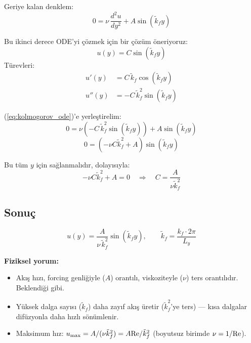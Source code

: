 Geriye kalan denklem:
\begin{equation}
    \boxed{0 = \nu \, \frac{d^2 u}{d y^2} + A \sin(\tilde{k}_f y)}
    \label{eq:kolmogorov_ode}
\end{equation}

Bu ikinci derece ODE'yi çözmek için bir çözüm öneriyoruz:
\begin{equation}
    u(y) = C \sin(\tilde{k}_f y)
\end{equation}
Türevleri:
\begin{align}
    u'(y) &= C \, \tilde{k}_f \cos(\tilde{k}_f y) \\
    u''(y) &= -C \, \tilde{k}_f^2 \sin(\tilde{k}_f y)
\end{align}

(\ref{eq:kolmogorov_ode})'e yerleştirelim:
\begin{equation}
    0 = \nu \left( -C \, \tilde{k}_f^2 \sin(\tilde{k}_f y) \right) + A \sin(\tilde{k}_f y)
\end{equation}
\begin{equation}
    0 = \left( -\nu C \tilde{k}_f^2 + A \right) \sin(\tilde{k}_f y)
\end{equation}

Bu tüm $y$ için sağlanmalıdır, dolayısıyla:
\begin{equation}
    -\nu C \tilde{k}_f^2 + A = 0 \quad \Longrightarrow \quad C = \frac{A}{\nu \tilde{k}_f^2}
\end{equation}

\subsection{Sonuç}

\begin{equation}
    \boxed{u(y) = \frac{A}{\nu \, \tilde{k}_f^2} \sin(\tilde{k}_f y), \qquad \tilde{k}_f = \frac{k_f \cdot 2\pi}{L_y}}
    \label{eq:kolmogorov_solution}
\end{equation}

\textbf{Fiziksel yorum:}
\begin{itemize}
    \item Akış hızı, forcing genliğiyle ($A$) orantılı, viskoziteyle ($\nu$) ters orantılıdır. Beklendiği gibi.
    \item Yüksek dalga sayısı ($\tilde{k}_f$) daha zayıf akış üretir ($\tilde{k}_f^2$'ye ters) --- kısa dalgalar difüzyonla daha hızlı sönümlenir.
    \item Maksimum hız: $u_{\max} = A/(\nu \tilde{k}_f^2) = A \mathrm{Re} / \tilde{k}_f^2$ (boyutsuz birimde $\nu = 1/\mathrm{Re}$).
\end{itemize}

